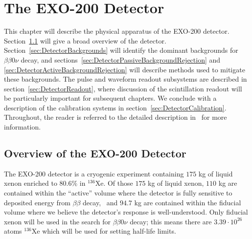 \renewcommand{\thechapter}{2}
\chapter{The EXO-200 Detector}

This chapter will describe the physical apparatus of the EXO-200 detector.  Section~\ref{sec:DetectorOverview} will give a broad overview of the detector.  Section~\ref{sec:DetectorBackgrounds} will identify the dominant backgrounds for $\beta\beta 0\nu$ decay, and sections~\ref{sec:DetectorPassiveBackgroundRejection} and \ref{sec:DetectorActiveBackgroundRejection} will describe methods used to mitigate these backgrounds.  The pulse and waveform readout subsystems are described in section~\ref{sec:DetectorReadout}, where discussion of the scintillation readout will be particularly important for subsequent chapters.  We conclude with a description of the calibration systems in section~\ref{sec:DetectorCalibration}.  Throughout, the reader is referred to the detailed description in~\cite{detectorPartI} for more information.

\section{Overview of the EXO-200 Detector}\label{sec:DetectorOverview}

The EXO-200 detector is a cryogenic experiment containing $175$ kg of liquid xenon enriched to $80.6\%$ in $^{136}$Xe.  Of those $175$ kg of liquid xenon, $110$ kg are contained within the ``active'' volume where the detector is fully sensitive to deposited energy from $\beta\beta$ decay,~\cite{detectorPartI} and $94.7$ kg are contained within the fiducial volume where we believe the detector's response is well-understood.  Only fiducial xenon will be used in the search for $\beta\beta 0\nu$ decay; this means there are $3.39 \cdot 10^{26}$ atoms $^{136}$Xe which will be used for setting half-life limits.~\cite{NewEXObb0nPaper_2014}

